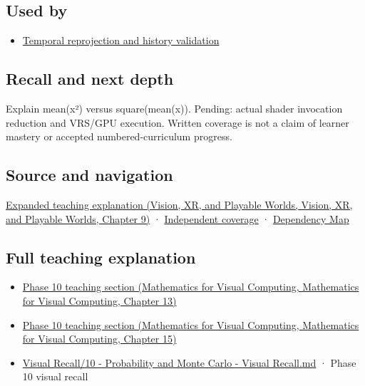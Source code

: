 \subsection{Used by}\label{appendix-4192b2bdd21e-used-by}

\begin{itemize}
\tightlist
\item
  \hyperref[appendix-0727340a4428]{Temporal reprojection and history validation}
\end{itemize}

\subsection{Recall and next depth}\label{appendix-4192b2bdd21e-recall-and-next-depth}

Explain mean(x²) versus square(mean(x)). Pending: actual shader invocation reduction and VRS/GPU execution. Written coverage is not a claim of learner mastery or accepted numbered-curriculum progress.

\subsection{Source and navigation}\label{appendix-4192b2bdd21e-source-and-navigation}

\href{../07-Vision-XR-and-Playable-Worlds/main.pdf\#nameddest=04-visual-computing-ii-ch042-multiresolution-work-must-preserve-the-right-information}{Expanded teaching explanation (Vision, XR, and Playable Worlds, Vision, XR, and Playable Worlds, Chapter 9)} · \hyperref[appendix-fd090d982a15-xr01---independent-seeing-and-representation-source]{Independent coverage} · \hyperref[appendix-4ad47bdd269a]{Dependency Map}

\subsection{Full teaching explanation}\label{appendix-4192b2bdd21e-full-teaching-explanation}

\begin{itemize}
\tightlist
\item
  \href{../02-Mathematics-for-Visual-Computing/main.pdf\#nameddest=02-foundations-ii-ch029-a-computer-produces-deterministic-pseudorandom-sequences}{Phase 10 teaching section (Mathematics for Visual Computing, Mathematics for Visual Computing, Chapter 13)}
\item
  \href{../02-Mathematics-for-Visual-Computing/main.pdf\#nameddest=02-foundations-ii-ch031-use-probability-to-evaluate-graphics-and-research-claims}{Phase 10 teaching section (Mathematics for Visual Computing, Mathematics for Visual Computing, Chapter 15)}
\item
  \hyperref[appendix-cb5af353ef77]{Visual Recall/10 - Probability and Monte Carlo - Visual Recall.md} · Phase 10 visual recall
\end{itemize}
